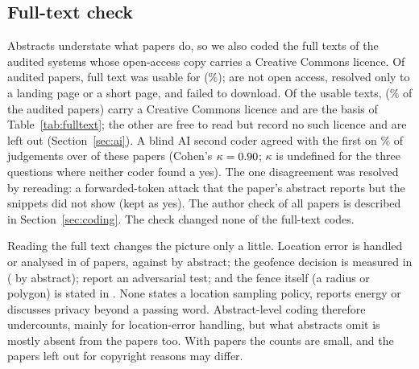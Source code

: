 \documentclass[preprint,12pt]{elsarticle}
\begin{document}
\subsection{Full-text check}\label{sec:fulltext}
Abstracts understate what papers do, so we also coded the full texts of the audited systems whose open-access copy carries a Creative Commons licence. Of \ftTried{} audited papers, full text was usable for \ftAllN{} (\ftPct\%); \ftNoOA{} are not open access, \ftShort{} resolved only to a landing page or a short page, and \ftErr{} failed to download. Of the \ftAllN{} usable texts, \ftN{} (\ftCcPct\% of the audited papers) carry a Creative Commons licence and are the basis of Table~\ref{tab:fulltext}; the other \ftLicNone{} are free to read but record no such licence and are left out (Section~\ref{sec:ai}). A blind AI second coder agreed with the first on \agPct\% of \agJ{} judgements over \agN{} of these papers (Cohen's $\kappa=0.90$; $\kappa$ is undefined for the three questions where neither coder found a yes). The one disagreement was resolved by rereading: a forwarded-token attack that the paper's abstract reports but the snippets did not show (kept as yes).\humanSentence{} The author check of all \ftN{} papers is described in Section~\ref{sec:coding}. The check changed none of the \ftCodes{} full-text codes.

Reading the full text changes the picture only a little. Location error is handled or analysed in \ftQone{} of \ftN{} papers, against \ftAbsQone{} by abstract; the geofence decision is measured in \ftQtwo{} (\ftAbsQtwo{} by abstract); \ftQthree{} report an adversarial test; and the fence itself (a radius or polygon) is stated in \ftQseven{}. None states a location sampling policy, reports energy or discusses privacy beyond a passing word. Abstract-level coding therefore undercounts, mainly for location-error handling, but what abstracts omit is mostly absent from the papers too. With \ftN{} papers the counts are small, and the \ftLicNone{} papers left out for copyright reasons may differ.



\end{document}
